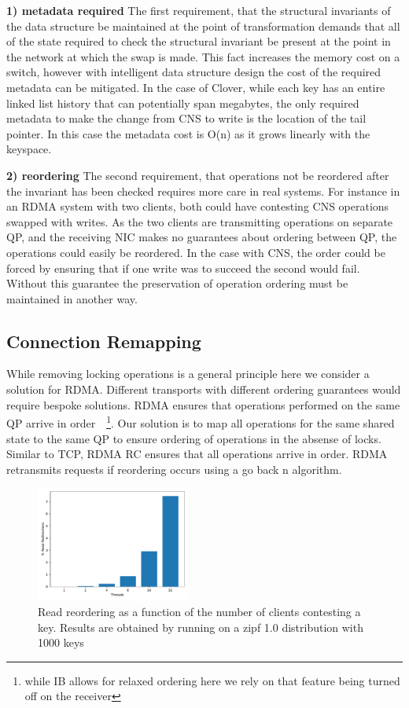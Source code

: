 \textbf{1) metadata required} The first requirement, that the structural invariants
of the data structure be maintained at the point of transformation demands that
all of the state required to check the structural invariant be present at the
point in the network at which the swap is made. This fact increases the memory
cost on a switch, however with intelligent data structure design the cost of the
required metadata can be mitigated. In the case of Clover, while each key has
an entire linked list history that can potentially span megabytes, the only
required metadata to make the change from CNS to write is the location of the
tail pointer. In this case the metadata cost is O(n) as it grows linearly with
the keyspace.

\textbf{2) reordering} The second requirement, that operations not be reordered
after the invariant has been checked requires more care in real systems. For
instance in an RDMA system with two clients, both could have contesting CNS
operations swapped with writes. As the two clients are transmitting operations on
separate QP, and the receiving NIC makes no guarantees about ordering between QP,
the operations could easily be reordered. In the case with CNS, the order could
be forced by ensuring that if one write was to succeed the second would fail.
Without this guarantee the preservation of operation ordering must be maintained
in another way.

\subsection{Connection Remapping}

While removing locking operations is a general principle here we consider a
solution for RDMA. Different transports with different ordering guarantees would
require bespoke solutions. RDMA ensures that operations performed on the same QP
arrive in order~\cite{infiniband spec}~\footnote{while IB allows for relaxed
ordering here we rely on that feature being turned off on the receiver}. Our
solution is to map all operations for the same shared state to the same QP to
ensure ordering of operations in the absense of locks. Similar to TCP, RDMA RC
ensures that all operations arrive in order. RDMA retransmits requests if
reordering occurs using a go back n algorithm.

\begin{figure}
    \includegraphics[width=0.45\textwidth]{fig/read_reordering.pdf}
    \caption{Read reordering as a function of the number of clients contesting a key. Results are obtained by running on a zipf 1.0 distribution with 1000 keys}
    \label{fig:reorder}
\end{figure}


